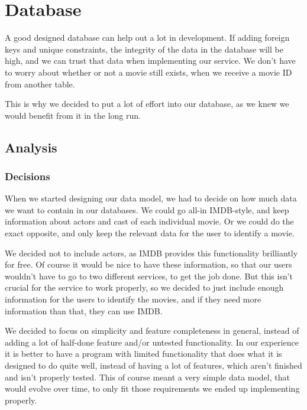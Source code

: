 \section{Database}
\label{Design_Database}
A good designed database can help out a lot in development. If adding foreign keys and unique constraints, the integrity of the data in the database will be high, and we can trust that data when implementing our service. We don't have to worry about whether or not a movie still exists, when we receive a movie ID from another table.

This is why we decided to put a lot of effort into our database, as we knew we would benefit from it in the long run.

\subsection{Analysis}
\label{Design_Database_Analysis}

\subsubsection{Decisions}
\label{Design_Database_Analysis_Decisions}

When we started designing our data model, we had to decide on how much data we want to contain in our databases. We could go all-in IMDB-style, and keep information about actors and cast of each individual movie. Or we could do the exact opposite, and only keep the relevant data for the user to identify a movie.

We decided not to include actors, as IMDB provides this functionality brilliantly for free. Of course it would be nice to have these information, so that our users wouldn't have to go to two different services, to get the job done. But this isn't crucial for the service to work properly, so we decided to just include enough information for the users to identify the movies, and if they need more information than that, they can use IMDB.

We decided to focus on simplicity and feature completeness in general, instead of adding a lot of half-done feature and/or untested functionality. In our experience it is better to have a program with limited functionality that does what it is designed to do quite well, instead of having a lot of features, which aren't finished and isn't properly tested. This of course meant a very simple data model, that would evolve over time, to only fit those requirements we ended up implementing properly.

